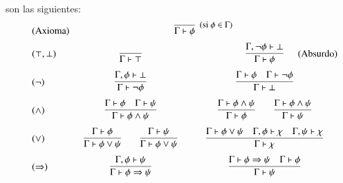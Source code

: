 \documentclass[a4paper,12pt]{book}
\def\limp{\Rightarrow}
\theoremstyle{definition}
\begin{document}
son las siguientes:
$$\def\myskip{\medskip}
\begin{array}{lc@{\qquad}c}
  (\text{Axioma}) & \multicolumn{2}{c}{
    \infer[\text{\small(si~$\phi\in\Gamma$)}]
    {\Gamma\vdash\phi}{}
  }\\
  \noalign{\myskip}
  ({\top},{\bot}) & \begin{array}{c}
    \infer{\Gamma\vdash\top}{\mathstrut}
  \end{array} & \begin{array}{c}
    \infer{\Gamma\vdash\phi}{\Gamma,\lnot\phi\vdash\bot}
  \end{array}\rlap{\quad(Absurdo)} \\
  \noalign{\myskip}
  ({\lnot}) & \begin{array}{c}
    \infer{\Gamma\vdash\lnot\phi}{\Gamma,\phi\vdash\bot}
  \end{array} & \begin{array}{c}
    \infer{\Gamma\vdash\bot}
    {\Gamma\vdash\phi & \Gamma\vdash\lnot\phi}
  \end{array} \\
  \noalign{\myskip}
  ({\land}) & \begin{array}{c}
    \infer{\Gamma\vdash\phi\land\psi}
    {\Gamma\vdash\phi & \Gamma\vdash\psi}
  \end{array} & \begin{array}{c}
    \infer{\Gamma\vdash\phi}{\Gamma\vdash\phi\land\psi}\qquad
    \infer{\Gamma\vdash\psi}{\Gamma\vdash\phi\land\psi}
  \end{array} \\
  \noalign{\myskip}
  ({\lor}) & \begin{array}{c}
    \infer{\Gamma\vdash\phi\lor\psi}{\Gamma\vdash\phi}\qquad
    \infer{\Gamma\vdash\phi\lor\psi}{\Gamma\vdash\psi}
  \end{array} & \begin{array}{c}
    \infer{\Gamma\vdash\chi}
    {\Gamma\vdash\phi\lor\psi &
      \Gamma,\phi\vdash\chi & \Gamma,\psi\vdash\chi}
  \end{array} \\
  \noalign{\myskip}
  ({\limp}) & \begin{array}{c}
    \infer{\Gamma\vdash\phi\limp\psi}{\Gamma,\phi\vdash\psi}
  \end{array} & \begin{array}{c}
    \infer{\Gamma\vdash\psi}
    {\Gamma\vdash\phi\limp\psi & \Gamma\vdash\phi}
  \end{array} \\

\end{array}$$
\end{document}
